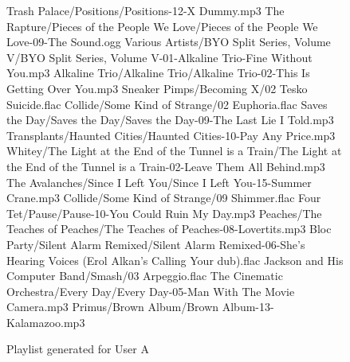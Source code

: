 \begin{figure}[p]
	\caption{Playlist generated for User A}
	\label{fig:testing:user:playlist:a}
	\begin{listing}{1}
Trash Palace/Positions/Positions-12-X Dummy.mp3
The Rapture/Pieces of the People We Love/Pieces of the People We Love-09-The Sound.ogg
Various Artists/BYO Split Series, Volume V/BYO Split Series, Volume V-01-Alkaline Trio-Fine Without You.mp3
Alkaline Trio/Alkaline Trio/Alkaline Trio-02-This Is Getting Over You.mp3
Sneaker Pimps/Becoming X/02 Tesko Suicide.flac
Collide/Some Kind of Strange/02 Euphoria.flac
Saves the Day/Saves the Day/Saves the Day-09-The Last Lie I Told.mp3
Transplants/Haunted Cities/Haunted Cities-10-Pay Any Price.mp3
Whitey/The Light at the End of the Tunnel is a Train/The Light at the End of the Tunnel is a Train-02-Leave Them All Behind.mp3
The Avalanches/Since I Left You/Since I Left You-15-Summer Crane.mp3
Collide/Some Kind of Strange/09 Shimmer.flac
Four Tet/Pause/Pause-10-You Could Ruin My Day.mp3
Peaches/The Teaches of Peaches/The Teaches of Peaches-08-Lovertits.mp3
Bloc Party/Silent Alarm Remixed/Silent Alarm Remixed-06-She's Hearing Voices (Erol Alkan's Calling Your dub).flac
Jackson and His Computer Band/Smash/03 Arpeggio.flac
The Cinematic Orchestra/Every Day/Every Day-05-Man With The Movie Camera.mp3
Primus/Brown Album/Brown Album-13-Kalamazoo.mp3
\end{listing}
\end{figure}
